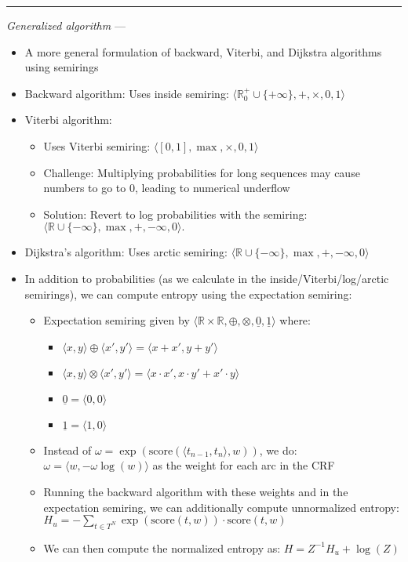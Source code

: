 {\color{lightgrey}\hrule height 0.001mm}

\emph{Generalized algorithm} --- 
\begin{itemize}
    \item A more general formulation of backward, Viterbi, and Dijkstra algorithms using semirings
    \item Backward algorithm: Uses inside semiring:
    $
    \langle \mathbb{R}_0^+ \cup \{+\infty\}, +, \times, 0, 1 \rangle
    $
    \item Viterbi algorithm: 
    \begin{itemize}
        \item Uses Viterbi semiring:
        $
        \langle [0, 1], \max, \times, 0, 1 \rangle
        $
        \item Challenge: Multiplying probabilities for long sequences may cause numbers to go to $0$, leading to numerical underflow
        \item Solution: Revert to log probabilities with the semiring:
        $
        \langle \mathbb{R} \cup \{-\infty\}, \max, +, -\infty, 0 \rangle.
        $
    \end{itemize}
    \item Dijkstra's algorithm: Uses arctic semiring:
    $
    \langle \mathbb{R} \cup \{-\infty\}, \max, +, -\infty, 0 \rangle
    $
    \item In addition to probabilities (as we calculate in the inside/Viterbi/log/arctic semirings), we can compute entropy using the expectation semiring:
    \begin{itemize}
        \item Expectation semiring given by $
        \langle \mathbb{R} \times \mathbb{R}, \oplus, \otimes, \underline{0}, \underline{1} \rangle
        $ where:
        \begin{itemize}
            \item
            $
            \langle x, y \rangle \oplus \langle x', y' \rangle = \langle x + x', y + y' \rangle
            $
            \item $
            \langle x, y \rangle \otimes \langle x', y' \rangle = \langle x \cdot x', x \cdot y' + x' \cdot y \rangle$
            \item $\underline{0} = \langle 0,0 \rangle$
            \item $\underline{1} = \langle 1,0 \rangle$
        \end{itemize}
        \item Instead of $\omega = \exp(\textrm{score}(\langle t_{n-1}, t_n \rangle, w))$, we do:
        $
        \omega = \langle w, -\omega \log(w) \rangle
        $
        as the weight for each arc in the CRF
        \item Running the backward algorithm with these weights and in the expectation semiring, we can additionally compute unnormalized entropy:
        $
        H_u = -\sum_{t \in T^N} \exp(\textrm{score}(t, w)) \cdot \textrm{score}(t, w)
        $
        \item We can then compute the normalized entropy as: 
        $
        H = Z^{-1} H_u + \log(Z)
        $
    \end{itemize}
\end{itemize}


